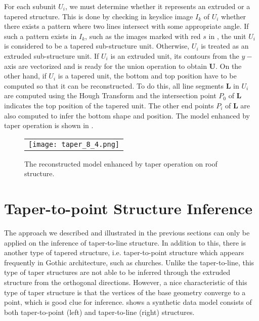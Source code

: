 For each subunit $U_i$, we must determine whether it represents an extruded or
a tapered structure.
This is done by checking in keyslice image $I_k$ of $U_i$ whether there exists
a pattern where two lines intersect with some appropriate angle.
If such a pattern exists in $I_k$, such as the images marked with red $s$ in
, the unit $U_i$ is considered to be a tapered sub-structure unit.
Otherwise, $U_i$ is treated as an extruded sub-structure unit.
If $U_i$ is an extruded unit, its contours from the $y-$ axis are vectorized
and is ready for the union operation to obtain $\boldsymbol{U}$.
On the other hand, if $U_i$ is a tapered unit, the bottom and top position
have to be computed so that it can be reconstructed.
To do this, all line segments $\boldsymbol{L}$ in $U_i$ are computed using
the Hough Transform and the intersection point $P_0$ of $\boldsymbol{L}$
indicates the top position of the tapered unit.
The other end points $P_i$ of $\boldsymbol{L}$ are also computed to infer
the bottom shape and position. 
The model enhanced by taper operation is shown in .

\begin{figure}[htbp]
\begin{center}
\begin{tabular}{c}
\texttt{[image: taper\_8\_4.png]}
\end{tabular}
\end{center}
\caption{ The reconstructed model enhanced by taper operation on roof structure. }
\label{fig:DXF_taper_model}
\end{figure}

\section{Taper-to-point Structure Inference}
\label{sec:tsd_ttp}
The approach we described and illustrated in the previous sections can only be
applied on the inference of taper-to-line structure. 
In addition to this, there is another
type of tapered structure, i.e. taper-to-point structure which appears frequently in 
Gothic architecture, such as churches.
Unlike the taper-to-line, this type of taper structures are not able to be inferred 
through the extruded structure from the orthogonal directions.
However, a nice characteristic of this type of taper structure is that
the vertices of the base geometry converge to a point, which is good clue for inference.
 shows a synthetic data model consists of both taper-to-point (left)
and taper-to-line (right) structures. 

